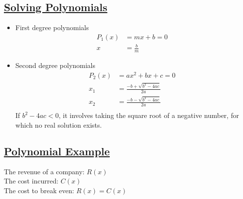 \documentclass{article}
\begin{document}
\subsection{\underline{Solving Polynomials}}
\begin{itemize}
  \item First degree polynomials\\
  \begin{align*}
    P_{1}(x) &= mx + b = 0\\
    x &= \frac{b}{m}
  \end{align*}
  \item Second degree polynomials\\
  \begin{align*}
    P_{2}(x) &= ax^{2} + bx + c = 0\\
    x_{1} &= \frac{-b+\sqrt{b^{2}-4ac}}{2a}\\
    x_{2} &= \frac{-b-\sqrt{b^{2}-4ac}}{2a}\\
  \end{align*}
  If $b^{2} - 4ac < 0$, it involves taking the square root of a negative number, for which no real solution exists.
\end{itemize}

\subsection{\underline{Polynomial Example}}
The revenue of a company: $R(x)$\\
The cost incurred: $C(x)$\\
The cost to break even: $R(x) = C(x)$\\
\end{document}
